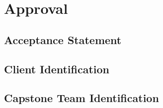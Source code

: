\documentclass[10pt,letterpaper]{article}
\begin{document}
\section{Approval}


\subsection{Acceptance Statement}


\subsection{Client Identification}


\subsection{Capstone Team Identification}



\clearpage
{}



\end{document}
